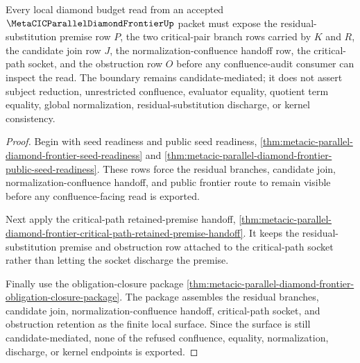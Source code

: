 \begin{theorem}
\label{thm:metacic-parallel-diamond-frontier-candidate-critical-pair-boundary}
Every local diamond budget read from an accepted $\MetaCICParallelDiamondFrontierUp$ packet must expose the residual-substitution premise row $P$, the two critical-pair branch rows carried by $K$ and $R$, the candidate join row $J$, the normalization-confluence handoff row, the critical-path socket, and the obstruction row $O$ before any confluence-audit consumer can inspect the read. The boundary remains candidate-mediated; it does not assert subject reduction, unrestricted confluence, evaluator equality, quotient term equality, global normalization, residual-substitution discharge, or kernel consistency.
\end{theorem}
\begin{proof}
Begin with seed readiness and public seed readiness, \autoref{thm:metacic-parallel-diamond-frontier-seed-readiness} and \autoref{thm:metacic-parallel-diamond-frontier-public-seed-readiness}. These rows force the residual branches, candidate join, normalization-confluence handoff, and public frontier route to remain visible before any confluence-facing read is exported.

Next apply the critical-path retained-premise handoff, \autoref{thm:metacic-parallel-diamond-frontier-critical-path-retained-premise-handoff}. It keeps the residual-substitution premise and obstruction row attached to the critical-path socket rather than letting the socket discharge the premise.

Finally use the obligation-closure package \autoref{thm:metacic-parallel-diamond-frontier-obligation-closure-package}. The package assembles the residual branches, candidate join, normalization-confluence handoff, critical-path socket, and obstruction retention as the finite local surface. Since the surface is still candidate-mediated, none of the refused confluence, equality, normalization, discharge, or kernel endpoints is exported.
\end{proof}
